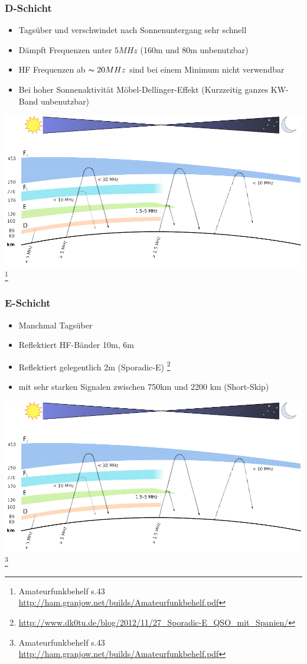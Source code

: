 \begin{frame}
    \frametitle{D-Schicht}
    \begin{itemize}
    			\item Tagsüber und verschwindet nach Sonnenuntergang sehr schnell
			\item Dämpft Frequenzen unter $5MHz$ (160m und 80m unbenutzbar)
                        \item HF Frequenzen ab $\thicksim20MHz$ sind bei einem Minimum nicht verwendbar
       		 	\item Bei hoher Sonnenaktivität Möbel-Dellinger-Effekt (Kurzzeitig ganzes KW-Band unbenutzbar)
    \end{itemize}
    \begin{center}
        \includegraphics[width=.6\textwidth,height=.5\textheight,keepaspectratio]{e09/schichten_behelf_43.png}
        \footnote{\tiny Amateurfunkbehelf s.43 \url{http://ham.granjow.net/builds/Amateurfunkbehelf.pdf}}
    \end{center}
\end{frame}

\begin{frame}
    \frametitle{E-Schicht}
    \begin{itemize}
    		\item Manchmal Tagsüber
			\item Reflektiert HF-Bänder 10m, 6m
            \item Reflektiert gelegentlich 2m (Sporadic-E) \footnote{\tiny \url{http://www.dk0tu.de/blog/2012/11/27_Sporadic-E_QSO_mit_Spanien/}}
            \item mit sehr starken Signalen zwischen 750km und 2200 km (Short-Skip)
    \end{itemize}
    \begin{center}
        \includegraphics[width=.8\textwidth,height=.4\textheight,keepaspectratio]{e09/schichten_behelf_43.png}
        \footnote{\tiny Amateurfunkbehelf s.43 \url{http://ham.granjow.net/builds/Amateurfunkbehelf.pdf}}
    \end{center}
\end{frame}

